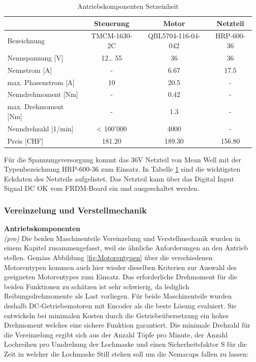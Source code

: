 \begin{table}[H]
	\centering
	\caption{Antriebskomponenten Setzeinheit \protect\cite{Trinamic} \protect\cite{36V_Netzteil}}
	\begin{tabular}{|l|c|c|c|}
		\hline 
		 & \textbf{Steuerung} & \textbf{Motor} & \textbf{Netzteil} \\
		\hline
		Bezeichnung & TMCM-1630-2C & QBL5704-116-04-042 & HRP-600-36 \\
		\hline
		Nennspannung [V] & 12… 55 & 36    & 36 \\
		\hline
		Nennstrom [A] & -     & 6.67  & 17.5 \\
		\hline
		max. Phasenstrom [A] & 10    & 20.5  & - \\
		\hline
		Nenndrehmoment [Nm] & -     & 0.42  & - \\
		\hline
		max. Drehmoment [Nm] & -     & 1.3   & - \\
		\hline
		Nenndrehzahl [1/min] & < 100'000 & 4000  & - \\
		\hline
		Preis [CHF] & 181.20 & 189.30 & 156.80 \\
		\hline
	\end{tabular}
	\label{tab:Trinamic}
\end{table}


Für die Spannungsversorgung kommt das 36V Netzteil von Mean Well mit der Typenbezeichnung HRP-600-36 zum Einsatz. In Tabelle \ref{tab:Trinamic} sind die wichtigsten Eckdaten des Netzteils aufgelistet. Das Netzteil kann über das Digital Input Signal DC OK vom FRDM-Board ein und ausgeschaltet werden.


\subsubsection{Vereinzelung und Verstellmechanik}
\textbf{Antriebskomponenten} \\
\textit{(pro)} Die beiden Maschinenteile Vereinzelung und Verstellmechanik wurden in einem Kapitel zusammengefasst, weil sie ähnliche Anforderungen an den Antrieb stellen. Gemäss Abbildung \ref{fig:Motorentypen} über die verschiedenen Motorentypen kommen auch hier wieder dieselben Kriterien zur Auswahl des geeigneten Motorentypes zum Einsatz. Das erforderliche Drehmoment für die beiden Funktionen zu schätzen ist sehr schwierig, da lediglich Reibungsdrehmomente als Last vorliegen. Für beide Maschinenteile wurden deshalb DC-Getriebemotoren mit Encoder als die beste Lösung evaluiert. Sie entwickeln bei minimalen Kosten durch die Getriebeübersetzung ein hohes Drehmoment welches eine sichere Funktion garantiert. Die minimale Drehzahl für die Vereinzelung ergibt sich aus der Anzahl Töpfe pro Minute, der Anzahl Lochreihen pro Umdrehung der Lochmaske und einen Sicherheitsfaktor S für die Zeit in welcher die Lochmaske Still stehen soll um die Nemacaps fallen zu lassen:

